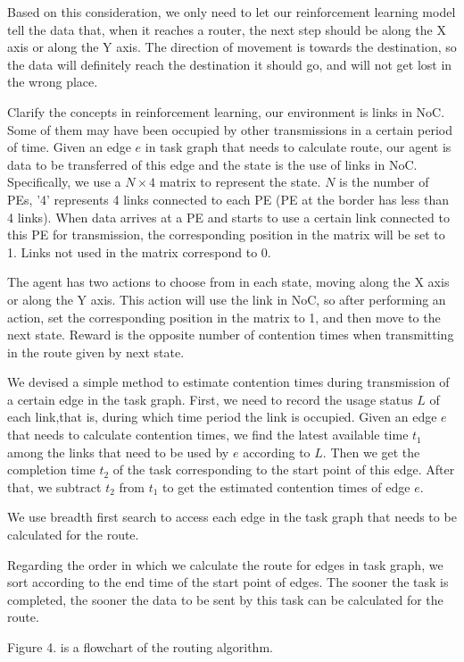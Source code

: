 Based on this consideration, we only need to let our reinforcement learning model tell the data that, when it reaches a router, the next step should be along the X axis or along the Y axis. The direction of movement is towards the destination, so the data will definitely reach the destination it should go, and will not get lost in the wrong place.

Clarify the concepts in reinforcement learning, our environment is links in NoC. Some of them may have been occupied by other transmissions in a certain period of time. Given an edge $e$ in task graph that needs to calculate route, our agent is data to be transferred of this edge and the state is the use of links in NoC. Specifically, we use a $N \times 4$ matrix to represent the state. $N$ is the number of PEs, '4' represents 4 links connected to each PE (PE at the border has less than 4 links). When data arrives at a PE and starts to use a certain link connected to this PE for transmission, the corresponding position in the matrix will be set to 1. Links not used in the matrix correspond to 0.

The agent has two actions to choose from in each state, moving along the X axis or along the Y axis. This action will use the link in NoC, so after performing an action, set the corresponding position in the matrix to 1, and then move to the next state. Reward is the opposite number of contention times when transmitting in the route given by next state.

We devised a simple method to estimate contention times during transmission of a certain edge in the task graph. First, we need to record the usage status $L$ of each link,that is, during which time period the link is occupied. Given an edge $e$ that needs to calculate contention times, we find the latest available time $t_1$ among the links that need to be used by $e$ according to $L$. Then we get the completion time $t_2$ of the task corresponding to the start point of this edge. After that, we subtract $t_2$ from $t_1$ to get the estimated contention times of edge $e$.

We use breadth first search to access each edge in the task graph that needs to be calculated for the route.

Regarding the order in which we calculate the route for edges in task graph, we sort according to the end time of the start point of edges. The sooner the task is completed, the sooner the data to be sent by this task can be calculated for the route.

Figure 4. is a flowchart of the routing algorithm.

